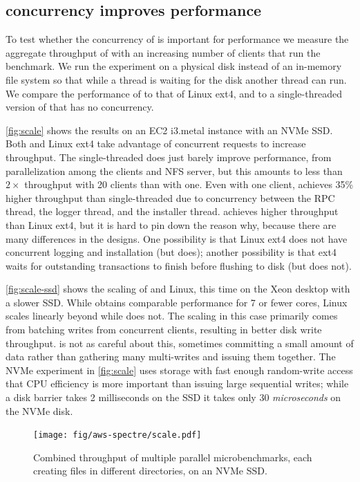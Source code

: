 \subsection{\txn concurrency improves performance}
\label{sec:eval:concur}

To test whether the concurrency of \txn is important for performance we
measure the aggregate throughput of \gnfs with an increasing number of
clients that run the  benchmark.  We run the experiment
on a physical disk instead of an in-memory
file system so that while a thread is waiting for the disk another thread
can run.  We compare the performance of \gnfs to that of Linux ext4,
and to a single-threaded version of \gnfs that has no concurrency.

\autoref{fig:scale} shows the results on an EC2 i3.metal instance with an NVMe
SSD.  Both \gnfs and Linux ext4 take advantage of concurrent requests to
increase throughput.
The single-threaded \gnfs does just barely improve performance, from
parallelization among the clients and NFS server, but this amounts to less than
$2\times$ throughput with 20 clients than with one. Even with one client, \gnfs
achieves 35\% higher throughput than
single-threaded \gnfs due to concurrency between the RPC thread,
the logger thread, and the installer thread.  \gnfs achieves higher
throughput than Linux ext4, but it is hard to pin down the reason why,
because there are many differences in the designs.  One possibility
is that Linux ext4 does not have concurrent logging and installation
(but \txn does); another possibility is that ext4 waits for outstanding
transactions to finish before flushing to disk (but \txn does not).

\autoref{fig:scale-ssd} shows the scaling of \gnfs and Linux, this time on the Xeon desktop with a
slower SSD. While \gnfs obtains comparable performance for 7 or fewer cores,
Linux scales linearly beyond while \gnfs does not. The scaling in this case
primarily comes from batching writes from concurrent clients, resulting in
better disk write throughput.
\txn is not as careful about this, sometimes committing a small amount of data
rather than gathering many multi-writes and issuing them
together. The NVMe experiment in \autoref{fig:scale} uses storage with fast
enough random-write access that CPU efficiency is more important than issuing
large sequential writes; while a disk barrier takes 2 milliseconds on the SSD it
takes only 30 \emph{microseconds} on the NVMe disk.

\begin{figure}[ht!]
  \centering

  \texttt{[image: fig/aws-spectre/scale.pdf]}

  \caption{Combined throughput of multiple parallel 
    microbenchmarks, each creating files in different directories,
    on an NVMe SSD.}
  \label{fig:scale}
\end{figure}

